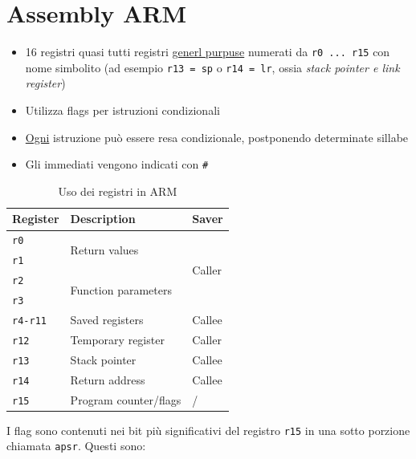 \section{Assembly ARM}
\begin{itemize}
	\item 16 registri quasi tutti registri \underline{generl purpuse} numerati da \verb|r0 ... r15| con nome simbolito (ad esempio \verb|r13 = sp| o \verb|r14 = lr|, ossia \textit{stack pointer e link register})
	\item Utilizza flags per istruzioni condizionali
	\item \underline{Ogni} istruzione può essere resa condizionale, postponendo determinate sillabe
	\item Gli immediati vengono indicati con \verb|#|
\end{itemize}
\begin{table}[H]
	\begin{center}
		\begin{tabular}{|l|l|l|}
			\hline
			Register      & Description                          & Saver                   \\
			\hline
			\verb|r0|     & \multirow{2}{*}{Return values}       & \multirow{4}{*}{Caller} \\
			\verb|r1|     &                                      &                         \\
			\cline{2-2}
			\verb|r2|     & \multirow{2}{*}{Function parameters} &                         \\
			\verb|r3|     &                                      &                         \\
			\hline
			\verb|r4-r11| & Saved registers                      & Callee                  \\
			\hline
			\verb|r12|    & Temporary register                   & Caller                  \\
			\verb|r13|    & Stack pointer                        & Callee                  \\
			\verb|r14|    & Return address                       & Callee                  \\
			\verb|r15|    & Program counter/flags                & /                       \\
			\hline
		\end{tabular}
	\end{center}
	\caption{Uso dei registri in ARM}
\end{table}
I flag sono contenuti nei bit più significativi del registro \verb|r15| in una sotto porzione chiamata \verb|apsr|. Questi sono:
